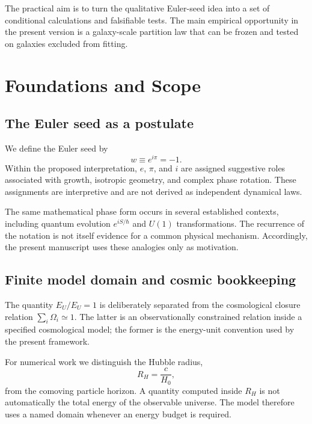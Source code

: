 \documentclass[twocolumn]{aastex631}
\begin{document}
The practical aim is to turn the qualitative Euler-seed idea into a set of conditional calculations and falsifiable tests. The main empirical opportunity in the present version is a galaxy-scale partition law that can be frozen and tested on galaxies excluded from fitting.

\section{Foundations and Scope}
\subsection{The Euler seed as a postulate}
We define the Euler seed by
\[
w\equiv e^{i\pi}=-1.
\]
Within the proposed interpretation, $e$, $\pi$, and $i$ are assigned suggestive roles associated with growth, isotropic geometry, and complex phase rotation. These assignments are interpretive and are not derived as independent dynamical laws.

The same mathematical phase form occurs in several established contexts, including quantum evolution $e^{iS/\hbar}$ and $U(1)$ transformations. The recurrence of the notation is not itself evidence for a common physical mechanism. Accordingly, the present manuscript uses these analogies only as motivation.

\subsection{Finite model domain and cosmic bookkeeping}
The quantity $E_U/E_U=1$ is deliberately separated from the cosmological closure relation $\sum_i\Omega_i\simeq1$. The latter is an observationally constrained relation inside a specified cosmological model; the former is the energy-unit convention used by the present framework.

For numerical work we distinguish the Hubble radius,
\[
R_H=\frac{c}{H_0},
\]
from the comoving particle horizon. A quantity computed inside $R_H$ is not automatically the total energy of the observable universe. The model therefore uses a named domain whenever an energy budget is required.
\end{document}
